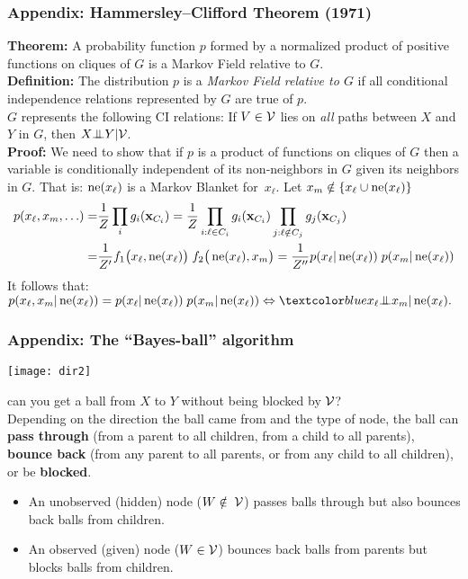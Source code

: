 \begin{frame}
\frametitle{Appendix: Hammersley--Clifford Theorem (1971)}

{\bf Theorem:} A probability function $p$ formed by a normalized product of
positive functions on cliques of $G$ is a Markov Field relative to
$G$.\\

{\bf Definition:} The distribution $p$ is a {\em Markov Field relative to
$G$} if all conditional independence relations represented by $G$ are true
of $p$. \\

$G$ represents the following CI relations: If $V \in \cal V$ lies on
\emph{all}  paths between $X$ and $Y$ in $G$, then $X{\bot\negthickspace\negthickspace\bot} Y|{\cal
V}$. \\ 


{\bf Proof:} We need to show that if $p$ is a product of functions on
cliques of $G$ then a variable is conditionally independent of its
non-neighbors in $G$ given its neighbors in $G$. That is: 
$\operatorname{ne}(x_{\ell})$ is a Markov Blanket for~$x_{\ell}$. Let $x_m \notin
\{x_{\ell} \cup \operatorname{ne}(x_{\ell}) \}$
%
\begin{equation*}
\begin{split}
p(x_{\ell},x_m,\ldots) =& \frac{1}{Z}\prod_i g_i({\bf x}_{C_i})=\frac{1}{Z}\prod_{i:\ell \in C_i}
g_i({\bf x}_{C_i})\prod_{j:\ell \notin C_j}g_j({\bf x}_{C_j})\\
=& \frac{1}{Z'}f_1\big(x_{\ell},\operatorname{ne}(x_\ell)\big) \; f_2\big(\operatorname{ne}(x_{\ell}),x_m \big) =
\frac{1}{Z''} p(x_{\ell}|\operatorname{ne}(x_{\ell}))\; p(x_m|\operatorname{ne}(x_{\ell})) 
\end{split}
\end{equation*}
%
It follows  that: \hspace{1mm}
%
$ \displaystyle p(x_{\ell},x_m|\neigh(x_{\ell})) = p(x_{\ell}|\neigh(x_{\ell}))\; p(x_m|\neigh(x_{\ell})) \Leftrightarrow 
\Blue{x_{\ell} \ci x_m | \neigh(x_{\ell})}.$


\end{frame}
\begin{frame}
\frametitle{Appendix: The ``Bayes-ball'' algorithm}

\centerline{\texttt{[image: dir2]}}

 can you get a ball from $X$ to $Y$ without being blocked
by ${\cal V}$? \\

Depending on the direction the ball came from and the type of node, the
ball can {\bf pass through} (from a parent to all children, from a
child to all parents), {\bf bounce back} (from any parent to all
parents, or from any child to all children), or be {\bf blocked}. 

\begin{itemize}
\item An unobserved (hidden) node ($W \notin \; {\cal V}$) passes balls through but also
  bounces back balls from children. 
\item An observed (given) node ($W \in {\cal V}$) bounces back balls from
  parents but blocks balls from children.
\end{itemize}
\end{frame}

